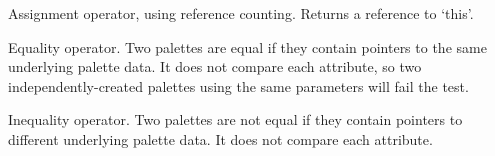 \label{wxpaletteassignment}


Assignment operator, using reference counting. Returns a reference
to `this'.

\label{wxpaletteequals}


Equality operator. Two palettes are equal if they contain pointers
to the same underlying palette data. It does not compare each attribute,
so two independently-created palettes using the same parameters will
fail the test.

\label{wxpalettenotequals}


Inequality operator. Two palettes are not equal if they contain pointers
to different underlying palette data. It does not compare each attribute.

